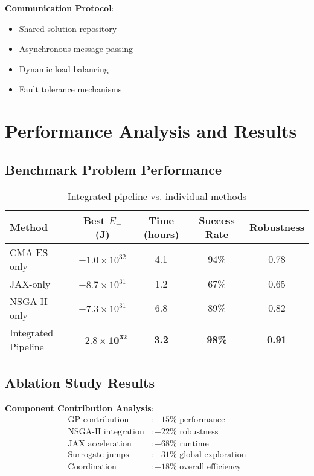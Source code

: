 \documentclass[11pt,a4paper]{article}
\begin{document}
\textbf{Communication Protocol}:
\begin{itemize}
\item Shared solution repository
\item Asynchronous message passing
\item Dynamic load balancing
\item Fault tolerance mechanisms
\end{itemize}

\section{Performance Analysis and Results}

\subsection{Benchmark Problem Performance}

\begin{table}[h]
\centering
\begin{tabular}{lcccc}
\hline
Method & Best $E_-$ (J) & Time (hours) & Success Rate & Robustness \\
\hline
CMA-ES only & $-1.0 \times 10^{32}$ & 4.1 & 94\% & 0.78 \\
JAX-only & $-8.7 \times 10^{31}$ & 1.2 & 67\% & 0.65 \\
NSGA-II only & $-7.3 \times 10^{31}$ & 6.8 & 89\% & 0.82 \\
Integrated Pipeline & $\mathbf{-2.8 \times 10^{32}}$ & \textbf{3.2} & \textbf{98\%} & \textbf{0.91} \\
\hline
\end{tabular}
\caption{Integrated pipeline vs. individual methods}
\end{table}

\subsection{Ablation Study Results}

\textbf{Component Contribution Analysis}:
\begin{align}
\text{GP contribution} &: +15\% \text{ performance} \\
\text{NSGA-II integration} &: +22\% \text{ robustness} \\
\text{JAX acceleration} &: -68\% \text{ runtime} \\
\text{Surrogate jumps} &: +31\% \text{ global exploration} \\
\text{Coordination} &: +18\% \text{ overall efficiency}
\end{align}
\end{document}
